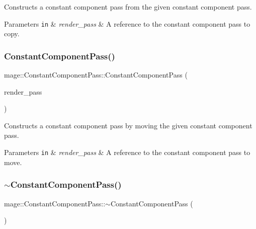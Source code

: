 Constructs a constant component pass from the given constant component pass.


\begin{DoxyParams}[1]{Parameters}
\mbox{\tt in}  & {\em render\+\_\+pass} & A reference to the constant component pass to copy. \\
\hline
\end{DoxyParams}
\hypertarget{classmage_1_1_constant_component_pass_a350d68fd2f8f17797361e7567d0337c7}{}\label{classmage_1_1_constant_component_pass_a350d68fd2f8f17797361e7567d0337c7} 
\subsubsection{\texorpdfstring{Constant\+Component\+Pass()}{ConstantComponentPass()}\hspace{0.1cm}{\footnotesize\ttfamily [3/3]}}
{\footnotesize\ttfamily mage\+::\+Constant\+Component\+Pass\+::\+Constant\+Component\+Pass (\begin{DoxyParamCaption}\item[{\hyperlink{classmage_1_1_constant_component_pass}{Constant\+Component\+Pass} \&\&}]{render\+\_\+pass }\end{DoxyParamCaption})\hspace{0.3cm}{\ttfamily [default]}}

Constructs a constant component pass by moving the given constant component pass.


\begin{DoxyParams}[1]{Parameters}
\mbox{\tt in}  & {\em render\+\_\+pass} & A reference to the constant component pass to move. \\
\hline
\end{DoxyParams}
\hypertarget{classmage_1_1_constant_component_pass_aaa94607b422672dab4cb77f129382d1b}{}\label{classmage_1_1_constant_component_pass_aaa94607b422672dab4cb77f129382d1b} 
\subsubsection{\texorpdfstring{$\sim$\+Constant\+Component\+Pass()}{~ConstantComponentPass()}}
{\footnotesize\ttfamily mage\+::\+Constant\+Component\+Pass\+::$\sim$\+Constant\+Component\+Pass (\begin{DoxyParamCaption}{ }\end{DoxyParamCaption})\hspace{0.3cm}{\ttfamily [default]}}


